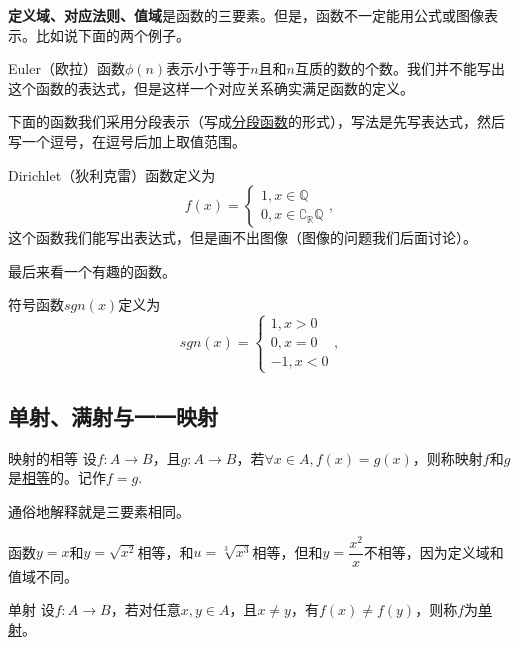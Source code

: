 \documentclass[lang=cn,math=cm,chinesefont=nofont,11pt,scheme=chinese,onecol]{elegantbook}
\begin{document}
\begin{spacing}{2.0}
  \textbf{定义域、对应法则、值域}是函数的三要素。但是，函数不一定能用公式或图像表示。比如说下面的两个例子。
\end{spacing}

\begin{example}
  Euler（欧拉）函数$\phi (n)$表示小于等于$n$且和$n$互质的数的个数。我们并不能写出这个函数的表达式，但是这样一个对应关系确实满足函数的定义。
\end{example}

下面的函数我们采用分段表示（写成\underline{分段函数}的形式），写法是先写表达式，然后写一个逗号，在逗号后加上取值范围。

\begin{example}
  Dirichlet（狄利克雷）函数定义为
  $$f(x)=
  \begin{cases}
    1,x\in\mathbb{Q}
    \\0,x\in\complement_{\mathbb{R}}\mathbb{Q}
  \end{cases},$$
  这个函数我们能写出表达式，但是画不出图像（图像的问题我们后面讨论）。
\end{example}

最后来看一个有趣的函数。

\begin{example}
  符号函数$sgn(x)$定义为
  $$sgn(x)=
  \begin{cases}
    1,x>0
    \\0,x=0
    \\-1,x<0
  \end{cases},$$
\end{example}

\subsection{单射、满射与一一映射}

\begin{definition}{映射的相等}
  设$f:A\rightarrow B$，且$g:A\rightarrow B$，若$\forall x\in A,f(x)=g(x)$，则称映射$f$和$g$是\underline{相等}的。记作$f=g$.
\end{definition}

通俗地解释就是三要素相同。

\begin{example}
  函数$y=x$和$y=\sqrt{x^2}$相等，和$u=\sqrt[3]{x^3}$相等，但和$y=\dfrac{x^2}{x}$不相等，因为定义域和值域不同。
\end{example}

\begin{definition}{单射}
  设$f:A\rightarrow B$，若对任意$x,y\in A$，且$x\neq y$，有$f(x)\neq f(y)$，则称$f$为\underline{单射}。
\end{definition}
\end{document}
